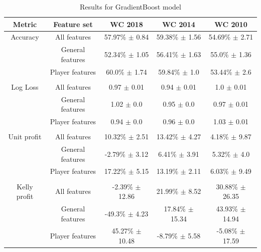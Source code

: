 \begin{table}
    \caption{Results for GradientBoost model}
    \begin{tabular}{| c  c| c| c| c|}
        \hline
        Metric& Feature set & \textbf{WC 2018} & \textbf{WC 2014} & \textbf{WC 2010}\\
        \hline
       Accuracy & All features & 57.97\% $\pm$ 0.84 & 59.38\% $\pm$ 1.56 & 54.69\% $\pm$ 2.71 \\
 & General features & 52.34\% $\pm$ 1.05 & 56.41\% $\pm$ 1.63 & 55.0\% $\pm$ 1.36 \\
 & Player features & 60.0\% $\pm$ 1.74 & 59.84\% $\pm$ 1.0 & 53.44\% $\pm$ 2.6 \\
 &  & & &  \\
Log Loss & All features & 0.97 $\pm$ 0.01 & 0.94 $\pm$ 0.01 & 1.0 $\pm$ 0.01 \\
 & General features & 1.02 $\pm$ 0.0 & 0.95 $\pm$ 0.0 & 0.97 $\pm$ 0.01 \\
 & Player features & 0.94 $\pm$ 0.0 & 0.96 $\pm$ 0.0 & 1.03 $\pm$ 0.01 \\
 &  & & &  \\
Unit profit & All features & 10.32\% $\pm$ 2.51 & 13.42\% $\pm$ 4.27 & 4.18\% $\pm$ 9.87 \\
 & General features & -2.79\% $\pm$ 3.12 & 6.41\% $\pm$ 3.91 & 5.32\% $\pm$ 4.0 \\
 & Player features & 17.22\% $\pm$ 5.15 & 13.19\% $\pm$ 2.11 & 6.03\% $\pm$ 9.49 \\
 &  & & &  \\
Kelly profit & All features & -2.39\% $\pm$ 12.86 & 21.99\% $\pm$ 8.52 & 30.88\% $\pm$ 26.35 \\
 & General features & -49.3\% $\pm$ 4.23 & 17.84\% $\pm$ 15.34 & 43.93\% $\pm$ 14.94 \\
 & Player features & 45.27\% $\pm$ 10.48 & -8.79\% $\pm$ 5.58 & -5.08\% $\pm$ 17.59 \\
 \hline
    \end{tabular}
    \label{table:onevsrestresults}
\end{table}

